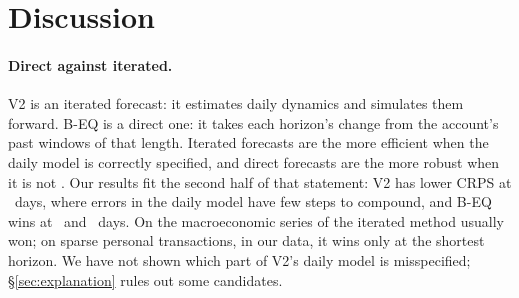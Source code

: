 \section{Discussion}
\label{sec:discussion}

\paragraph{Direct against iterated.} V2 is an iterated forecast: it
estimates daily dynamics and simulates them forward. B-EQ is a direct one:
it takes each horizon's change from the account's past windows of that
length. Iterated forecasts are the more efficient when the daily model is
correctly specified, and direct forecasts are the more robust when it is
not \citep{marcellino2006direct}. Our results fit the second half of that
statement: V2 has lower CRPS at \hA\ days, where errors in the daily model
have few steps to compound, and B-EQ wins at \hB\ and \hC\ days. On the
macroeconomic series of \citet{marcellino2006direct} the iterated method
usually won; on sparse personal transactions, in our data, it wins only at
the shortest horizon. We have not shown which part of V2's daily model is
misspecified; \S\ref{sec:explanation} rules out some candidates.

